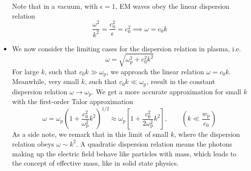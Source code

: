 \documentclass[11pt, a4paper]{article}
\newcommand{\e}{\epsilon}
\begin{document}
\begin{itemize}
	
	
	Note that in a vacuum, with $ \e = 1 $, EM waves obey the linear dispersion relation
	\begin{equation*}
		\frac{\omega^{2}}{k^{2}} = \frac{c_{0}^{2}}{\e} = c_{0}^{2} \implies \omega = c_{0}k
	\end{equation*}
	
	\item We now consider the limiting cases for the dispersion relation in plasma, i.e.
	\begin{equation*}
		 \omega = \sqrt{\omega_{\mathrm{p}}^{2} + c_{0}^{2}k^{2}}
	\end{equation*}
	For large $ k $, such that $ c_{0}k \gg \omega_{\text{p}} $, we approach the linear relation $ \omega = c_{0}k $. Meanwhile, very small $ k $, such that $ c_{0}k \ll \omega_{\text{p}} $, result in the constant dispersion relation $ \omega \to \omega_{\mathrm{p}} $. We get a more accurate approximation for small $ k $ with the first-order Talor approximation
	\begin{equation*}
		\omega = \omega_{\mathrm{p}}\left(1 + \frac{c_{0}^{2}}{\omega_{\mathrm{p}}^{2}} k^{2}\right)^{1/2} \approx \omega_{\mathrm{p}}\left[1 + \frac{c_{0}^{2}}{2 \omega_{\mathrm{p}}^{2}}k^{2}\right], \qquad \left(k \ll \frac{w_{\text{p}}}{c_{0}}\right)
	\end{equation*}
	As a side note, we remark that in this limit of small $ k $, where the dispersion relation obeys $ \omega \sim k^{2} $. A quadratic dispersion relation means the photons making up the electric field behave like particles with mass, which leads to the concept of effective mass, like in solid state physics.
\end{itemize}
\end{document}

